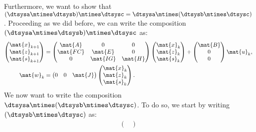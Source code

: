 \begin{definition}
Furthermore, we want to show that~$(\dtsysa\mtimes \dtsysb)\mtimes \dtsysc=\dtsysa\mtimes (\dtsysb\mtimes \dtsysc)$.
Proceeding as we did before, we can write the composition~$(\dtsysa\mtimes \dtsysb)\mtimes \dtsysc$ as:
\begin{equation*}
	\label{eq:dlin-5}
	\begin{aligned}
		\begin{pmatrix}
			\mat{x}_{k+1} \\
			\mat{z}_{k+1} \\
			\mat{s}_{k+1}
		\end{pmatrix} & =
		\begin{pmatrix}
			\mat{A}  & 0        & 0       \\
			\mat{FC} & \mat{E}  & 0       \\
			0        & \mat{IG} & \mat{H}
		\end{pmatrix}\begin{pmatrix}
			\mat{x}_k \\ \mat{z}_k\\ \mat{s}_k
		\end{pmatrix}+
		\begin{pmatrix}
			\mat{B} \\ 0\\ 0
		\end{pmatrix}\mat{u}_k,                                                \\
		\mat{w}_k                  & =\begin{pmatrix}
			0 & 0 & \mat{J}
		\end{pmatrix}\begin{pmatrix}
			\mat{x}_k \\ \mat{z}_k\\ \mat{s}_k
		\end{pmatrix}.
	\end{aligned}
\end{equation*}
We now want to write the composition~$\dtsysa\mtimes (\dtsysb\mtimes \dtsysc)$.
To do so, we start by writing~$(\dtsysb\mtimes \dtsysc)$ as:
\begin{equation*}
	\label{eq:dlin-6}
	\begin{aligned}
		\begin{pmatrix}

\end{pmatrix}
\end{aligned}
\end{equation*}
\end{definition}
